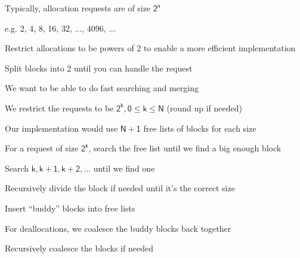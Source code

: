\begin{slide}


    Typically, allocation requests are of size $\mathsf{2^n}$

    \leftspace{}e.g. 2, 4, 8, 16, 32, ..., 4096, ...
    \medskip

    Restrict allocations to be powers of 2 to enable a more efficient
    implementation

    \leftspace{}Split blocks into 2 until you can handle the request
    \medskip

    We want to be able to do fast searching and merging

  \end{slide}

  \begin{slide}


    We restrict the requests to be $\mathsf{2^k, 0 \leq k \leq N}$ (round up if
    needed)
    \medskip

    Our implementation would use $\mathsf{N+1}$ free lists of blocks for each
    size
    \medskip

    For a request of size $\mathsf{2^k}$, search the free list until we find
    a big enough block

    \leftspace{}Search $\mathsf{k, k+1, k+2, ...}$ until we find one

    \leftspace{}\leftspace{}Recursively divide the block if needed until it's
    the correct size

    \leftspace{}\leftspace{}Insert “buddy” blocks into free lists
    \medskip

    For deallocations, we coalesce the buddy blocks back together

    \leftspace{}Recursively coalesce the blocks if needed

  \end{slide}


